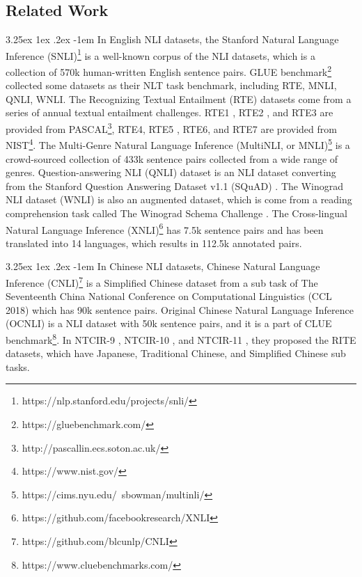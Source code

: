 \documentclass[12pt]{article}
\makeatletter
\renewcommand\paragraph{\@startsection{paragraph}{5}{\z@}%
  {3.25ex \@plus1ex \@minus.2ex}%
  {-1em}%
  {\normalfont\normalsize\bfseries}}
\makeatother
\begin{document}
\begin{CJK*}{UTF8}{bkai}
\begin{spacing}{1.77}
\subsection{Related Work} \label{sec:related_work}
\paragraph{}
In English NLI datasets, the Stanford Natural Language Inference (SNLI)\footnote{https://nlp.stanford.edu/projects/snli/} \cite{snli:emnlp2015} is a well-known corpus of the NLI datasets, which is a collection of 570k human-written English sentence pairs. GLUE benchmark\footnote{https://gluebenchmark.com/} collected some datasets as their NLT task benchmark, including RTE, MNLI, QNLI, WNLI. The Recognizing Textual Entailment (RTE) datasets come from a series of annual textual entailment challenges. RTE1 \cite{dagan2006pascal}, RTE2 \cite{bar2006second}, and RTE3 \cite{giampiccolo2007third} are provided from PASCAL\footnote{http://pascallin.ecs.soton.ac.uk/}, RTE4, RTE5 \cite{bentivogli2009fifth}, RTE6, and RTE7 are provided from NIST\footnote{https://www.nist.gov/}. The Multi-Genre Natural Language Inference (MultiNLI, or MNLI)\footnote{https://cims.nyu.edu/~sbowman/multinli/} \cite{N18-1101} is a crowd-sourced collection of 433k sentence pairs collected from a wide range of genres. Question-answering NLI (QNLI) \cite{wang2019glue} dataset is an NLI dataset converting from the Stanford Question Answering Dataset v1.1 (SQuAD) \cite{rajpurkar2016squad}. The Winograd NLI dataset (WNLI) is also an augmented dataset, which is come from a reading comprehension task called The Winograd Schema Challenge \cite{levesque2011winograd}. The Cross-lingual Natural Language Inference (XNLI)\footnote{https://github.com/facebookresearch/XNLI} has 7.5k sentence pairs and has been translated into 14 languages, which results in 112.5k annotated pairs.

\paragraph{}
In Chinese NLI datasets, Chinese Natural Language Inference (CNLI)\footnote{https://github.com/blcunlp/CNLI} is a Simplified Chinese dataset from a sub task of The Seventeenth China National Conference on Computational Linguistics (CCL 2018) which has 90k sentence pairs. Original Chinese Natural Language Inference (OCNLI) is a NLI dataset with 50k sentence pairs, and it is a part of CLUE benchmark\footnote{https://www.cluebenchmarks.com/}. In NTCIR-9 \cite{ntcir9rite1}, NTCIR-10 \cite{ntcir10rite2}, and NTCIR-11 \cite{ntcir11rite-val}, they proposed the RITE datasets, which have Japanese, Traditional Chinese, and Simplified Chinese sub tasks.


\end{spacing}
\end{CJK*}
\end{document}
